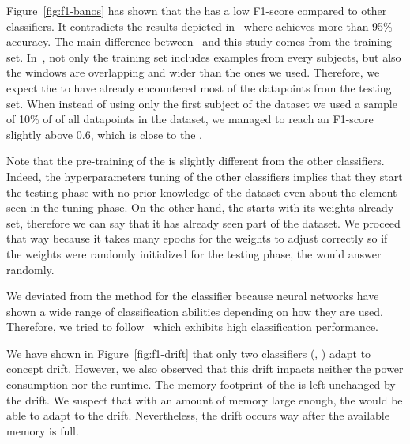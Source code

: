 Figure~\ref{fig:f1-banos} has shown that the \FNN has a low
F1-score compared to other classifiers. It contradicts the results
depicted in~\cite{omid_2019} where \FNN achieves more than 95\% 
accuracy. The main difference between~\cite{omid_2019} and this study comes
from the training set. In~\cite{omid_2019}, not only the training set includes examples from every
subjects, but also the windows are overlapping and wider than the ones we used.
Therefore, we expect the \FNN to have already encountered
most of the datapoints from the testing set. When instead of using only the
first subject of the \banosdataset dataset we used a sample of 10\% of of all datapoints in the \banosdataset dataset, we
managed to reach an F1-score slightly above 0.6, which is close to the \naivebayes.

Note that the pre-training of the \FNN is slightly different from the other
classifiers. Indeed, the hyperparameters tuning of the other classifiers
implies that they start the testing phase with no prior knowledge of the
dataset even about the element seen in the tuning phase. On the other hand, the
\FNN starts with its weights already set, therefore we can say that it has
already seen part of the dataset. We proceed that way because it takes many
epochs for the weights to adjust correctly so if the weights were randomly
initialized for the testing phase, the \FNN would answer randomly.

We deviated from the method for the \FNN classifier because neural networks have
shown a wide range of classification abilities depending on how they are used.
Therefore, we tried to follow~\cite{omid_2019} which exhibits high classification
performance.

We have shown in Figure~\ref{fig:f1-drift} that only two classifiers
(\hoeffdingtree, \mcnn) adapt to concept drift. However, we also observed
that this drift impacts neither the power consumption nor the runtime.
The memory footprint of the \hoeffdingtree is left unchanged by the drift.
We suspect that with an amount of memory large enough, the \mondrianforest would
be able to adapt to the drift. Nevertheless, the drift occurs way after the
available memory is full.
